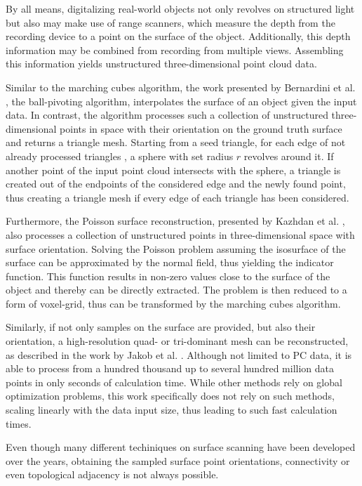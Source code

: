   By all means, digitalizing real-world objects not only revolves on structured light but also may make use of range scanners, which measure the depth from the recording device to a point on the surface of the object. Additionally, this depth information may be combined from recording from multiple views. Assembling this information yields unstructured three-dimensional point cloud data. 

  Similar to the marching cubes algorithm, the work presented by 
  Bernardini et al. \cite{817351}, the ball-pivoting algorithm, 
  interpolates the surface of an object given the input data.
  In contrast, the algorithm processes such a collection of unstructured 
  three-dimensional points in space with their orientation on the
  ground truth surface and returns a triangle mesh. Starting from
  a seed triangle, for each edge of not already processed triangles
  , a sphere with set radius $r$ revolves around it. If another point
  of the input point cloud intersects with the sphere, a triangle is 
  created out of the endpoints of the considered edge and the newly 
  found point, thus creating a triangle mesh if every edge of each 
  triangle has been considered. 
  

  Furthermore, the Poisson surface reconstruction, 
  presented by Kazhdan et al. \cite{Kazhdan:2006:PSR:1281957.1281965}, also processes a
  collection of unstructured points in three-dimensional
  space with surface orientation. Solving the Poisson problem 
  \cite{Genovese2006} assuming the isosurface of the surface can be 
  approximated by the normal field, thus yielding the
  indicator function. This function results in non-zero
  values close to the surface of the object and thereby 
  can be directly extracted. The problem is then reduced to a 
  form of voxel-grid, thus can be transformed by the marching
  cubes algorithm.

  Similarly, if not only samples on the surface are provided, 
  but also their orientation, a high-resolution quad- or 
  tri-dominant mesh can be reconstructed, as described in the 
  work by Jakob et al. \cite{Jakob2015Instant}. Although not limited to PC data,
  it is able to process from a hundred thousand up to several
  hundred million data points in only seconds of calculation time.
  While other methods rely on global optimization problems, this work 
  specifically does not rely on such methods, scaling linearly with 
  the data input size, thus leading to such fast calculation times.

  Even though many different techiniques on surface scanning have been
  developed over the years, obtaining the sampled surface point orientations,
  connectivity or even topological adjacency is not always possible.

